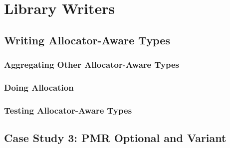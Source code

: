 \chapter{Library Writers}

\section{Writing Allocator-Aware Types}
\subsection{Aggregating Other Allocator-Aware Types}
\subsection{Doing Allocation}
\subsection{Testing Allocator-Aware Types}

\section{Case Study 3: PMR Optional and Variant}
